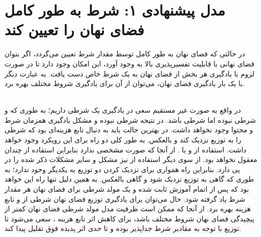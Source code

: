 \section{مدل پیشنهادی ۱: شرط به طور کامل فضای نهان را تعیین کند}
در حالتی که فضای نهان به طور کامل توسط مقدار شرط تعیین می‌گردد، اگر بتوان فضای نهانی با قابلیت تفسیرپذیری بالا به وجود آورد، این امکان وجود دارد تا در صورت لزوم با یادگیری هر بخش از فضای نهان به یک شرط خاص دست یافت. به عبارت دیگر با یک بار یادگیری فضای نهان، می‌توان از آن برای یادگیری شروط مختلف بهره برد.

\\
در واقع به صورت غیر مستقیم سعی در یادگیری یک \wae{} شرطی داریم؛ به طوری که \encoder{} و \decoder{} شرطی نبوده اما \priordist{} شرطی باشد. در نتیجه \decoder{} شرطی نبوده و مشکل یادگیری همزمان شرط و محتوا وجود نخواهد داشت. در بهترین حالت باید به دنبال تابع هزینه‌ای بود که \priordist{} شرطی را به توزیع \marginal{} \encoder{} نزدیک کند و بالعکس. به طور کلی دو راه برای این رویکرد وجود خواهد داشت. استفاده از \gan{} و یا \mmd{}. از آنجا که \priordist{} صورت مشخصی ندارد بنابراین استفاده از  \mmd{} چندان معقول نخواهد بود. از سوی دیگر استفاده از \gan{} نیز مشکل \modecollapse{} و سایر مشکلات ذکر شده را در پی دارد. بنابراین راه همواری برای نزدیک کردن دو توزیع به یکدیگر وجود ندارد؛ به طوری که گاهی \priordist{} به توزیع \marginal{} \encoder{} نزدیک شود و گاهی بالعکس. به همین دلیل تنها راه این خواهد بود که پس از اتمام آموزش \autoencoder{} ثابت شده و یک مولد شرطی برای فضای نهان هر مقدار شرط یاد گرفته شود. حال می‌توان برای یادگیری توزیع فضای نهان شرطی از \normalizingflownet{} و تابع هزینه \maxlikelihood{} بهره برد. از آنجا که ممکن است ظرفیت مدل مولد شرطی فضای نهان کمتر از پیچیدگی فضای نهان شروط مختلف باشد، برای کاهش اثر \meanseeking{} تابع هزینه \maxlikelihood{}، سعی می‌شود تا توزیع \marginal{} \encoder{} با توجه به مقادیر شرط جدا‌پذیر بوده و تا حدی اثر پدیده فوق تقلیل پیدا کند.
\\
